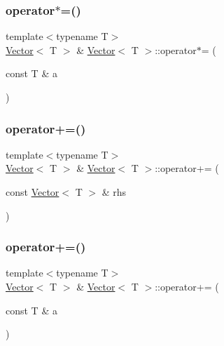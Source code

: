 \mbox{\label{classVector_a02e9c5296c7ddb1a2047a8c80d93e0d5_a02e9c5296c7ddb1a2047a8c80d93e0d5}} 
\subsubsection{\texorpdfstring{operator$\ast$=()}{operator*=()}\hspace{0.1cm}{\footnotesize\ttfamily [2/2]}}
{\footnotesize\ttfamily template$<$typename T$>$ \\
\mbox{\hyperlink{classVector}{Vector}}$<$ T $>$ \& \mbox{\hyperlink{classVector}{Vector}}$<$ T $>$\+::operator$\ast$= (\begin{DoxyParamCaption}\item[{const T \&}]{a }\end{DoxyParamCaption})\hspace{0.3cm}{\ttfamily [inline]}}

\mbox{\label{classVector_a0cdad8a65e9dd1ef60afaf32aa547f9e_a0cdad8a65e9dd1ef60afaf32aa547f9e}} 
\subsubsection{\texorpdfstring{operator+=()}{operator+=()}\hspace{0.1cm}{\footnotesize\ttfamily [1/2]}}
{\footnotesize\ttfamily template$<$typename T$>$ \\
\mbox{\hyperlink{classVector}{Vector}}$<$ T $>$ \& \mbox{\hyperlink{classVector}{Vector}}$<$ T $>$\+::operator+= (\begin{DoxyParamCaption}\item[{const \mbox{\hyperlink{classVector}{Vector}}$<$ T $>$ \&}]{rhs }\end{DoxyParamCaption})\hspace{0.3cm}{\ttfamily [inline]}}

\mbox{\label{classVector_a5650df0775f0677f76259cd3f474dded_a5650df0775f0677f76259cd3f474dded}} 
\subsubsection{\texorpdfstring{operator+=()}{operator+=()}\hspace{0.1cm}{\footnotesize\ttfamily [2/2]}}
{\footnotesize\ttfamily template$<$typename T$>$ \\
\mbox{\hyperlink{classVector}{Vector}}$<$ T $>$ \& \mbox{\hyperlink{classVector}{Vector}}$<$ T $>$\+::operator+= (\begin{DoxyParamCaption}\item[{const T \&}]{a }\end{DoxyParamCaption})\hspace{0.3cm}{\ttfamily [inline]}}

